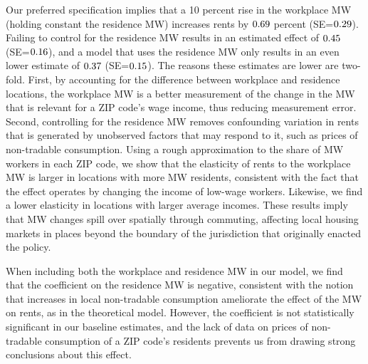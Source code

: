 
Our preferred specification implies that 
a 10 percent rise in the workplace MW (holding constant the residence MW) 
increases rents by $0.69$ percent (SE=$0.29$).
Failing to control for the residence MW results in an estimated effect of 
$0.45$ (SE=$0.16$), and a model that uses 
the residence MW only results in an even lower estimate of 
$0.37$ (SE=$0.15$).
The reasons these estimates are lower are two-fold.
First, by accounting for the difference between workplace and residence 
locations, the workplace MW is a better measurement of the change in the MW 
that is relevant for a ZIP code's wage income, thus reducing measurement 
error.
Second, controlling for the residence MW removes confounding variation in
rents that is generated by unobserved factors that may respond to it, 
such as prices of non-tradable consumption.
Using a rough approximation to the share of MW workers in each ZIP code, we show 
that the elasticity of rents to the workplace MW is larger in locations 
with more MW residents, consistent with the fact that the effect operates by
changing the income of low-wage workers.
Likewise, we find a lower elasticity in locations with larger average incomes.
These results imply that MW changes spill over spatially through commuting, 
affecting local housing markets in places beyond the boundary of the 
jurisdiction that originally enacted the policy.

When including both the workplace and residence MW in our model, we find that 
the coefficient on the residence MW is negative, consistent with the notion 
that increases in local non-tradable consumption ameliorate the effect of the
MW on rents, as in the theoretical model.
However, the coefficient is not statistically significant in our baseline
estimates, and the lack of data on prices of non-tradable consumption of a 
ZIP code's residents prevents us from drawing strong conclusions about 
this effect.


